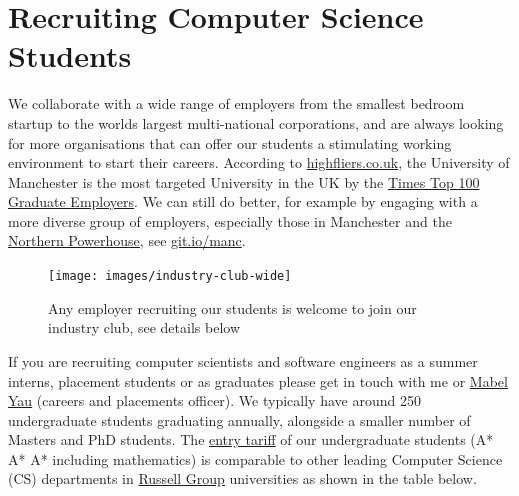 \documentclass[
  12pt,
]{book}
\begin{document}
\hypertarget{recruiting}{%
\section{Recruiting Computer Science Students}\label{recruiting}}

We collaborate with a wide range of employers from the smallest bedroom startup to the worlds largest multi-national corporations, and are always looking for more organisations that can offer our students a stimulating working environment to start their careers. According to \href{https://www.highfliers.co.uk}{highfliers.co.uk}, the University of Manchester is the most targeted University in the UK by the \href{https://www.top100graduateemployers.com}{Times Top 100 Graduate Employers}. \citep{Birchall2019} We can still do better, for example by engaging with a more diverse group of employers, especially those in Manchester and the \href{https://northernpowerhouse.gov.uk/}{Northern Powerhouse}, see \href{https://git.io/manc}{git.io/manc}. \citep{gitmanc, londonvstherest, hebdenbridge, manhattanchester, manchattan}

\begin{figure}

{\centering \texttt{[image: images/industry-club-wide]} 

}

\caption{Any employer recruiting our students is welcome to join our industry club, see details below}\label{fig:unnamed-chunk-3}
\end{figure}

If you are recruiting computer scientists and software engineers as a summer interns, placement students or as graduates please get in touch with me or \href{https://uk.linkedin.com/in/mabel-yau}{Mabel Yau} (careers and placements officer). We typically have around 250 undergraduate students graduating annually, alongside a smaller number of Masters and PhD students. The \href{https://www.ucas.com/ucas/tariff-calculator}{entry tariff} of our undergraduate students (A* A* A* including mathematics) is comparable to other leading Computer Science (CS) departments in \href{https://en.wikipedia.org/wiki/Russell_Group}{Russell Group} universities as shown in the table below.
\end{document}
